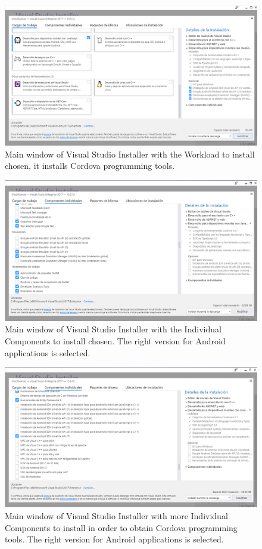 \begin{figure}
    \centering
    \includegraphics[width= \textwidth]{Figures/Projects/cor1}
    \caption{Main window of Visual Studio Installer with the Workload to install chosen, it installs Cordova programming tools.}
    \label{fig:cor1}
\end{figure}

\begin{figure}
    \centering
    \includegraphics[width= \textwidth]{Figures/Projects/cor2}
    \caption{Main window of Visual Studio Installer with the Individual Components to install chosen. The right version for Android applications is selected.}
    \label{fig:cor2}
\end{figure}

\begin{figure}
    \centering
    \includegraphics[width= \textwidth]{Figures/Projects/cor3}
    \caption{Main window of Visual Studio Installer with more Individual Components to install in order to obtain Cordova programming tools. The right version for Android applications is selected.}
    \label{fig:cor3}
\end{figure}


